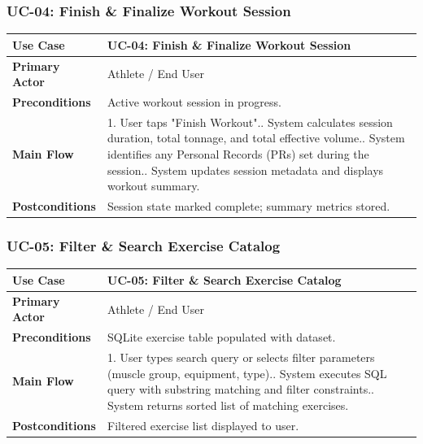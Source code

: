 \subsubsection{UC-04: Finish \& Finalize Workout Session}
\begin{table}[h!]
\centering
\small
\begin{tabularx}{\textwidth}{l X}
\toprule
\textbf{Use Case} & \textbf{UC-04: Finish \& Finalize Workout Session} \\
\midrule
\textbf{Primary Actor} & Athlete / End User \\
\textbf{Preconditions} & Active workout session in progress. \\
\textbf{Main Flow} & 
1. User taps "Finish Workout".\newline
2. System calculates session duration, total tonnage, and total effective volume.\newline
3. System identifies any Personal Records (PRs) set during the session.\newline
4. System updates session metadata and displays workout summary. \\
\textbf{Postconditions} & Session state marked complete; summary metrics stored. \\
\bottomrule
\end{tabularx}
\end{table}

\subsubsection{UC-05: Filter \& Search Exercise Catalog}
\begin{table}[h!]
\centering
\small
\begin{tabularx}{\textwidth}{l X}
\toprule
\textbf{Use Case} & \textbf{UC-05: Filter \& Search Exercise Catalog} \\
\midrule
\textbf{Primary Actor} & Athlete / End User \\
\textbf{Preconditions} & SQLite exercise table populated with dataset. \\
\textbf{Main Flow} & 
1. User types search query or selects filter parameters (muscle group, equipment, type).\newline
2. System executes SQL query with substring matching and filter constraints.\newline
3. System returns sorted list of matching exercises. \\
\textbf{Postconditions} & Filtered exercise list displayed to user. \\
\bottomrule
\end{tabularx}
\end{table}

